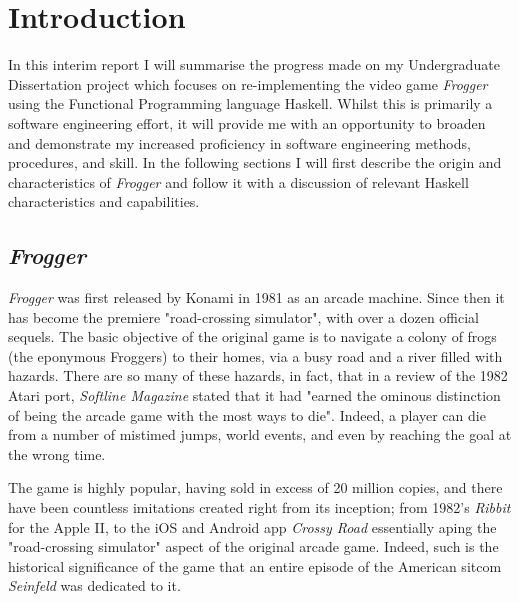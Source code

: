 \documentclass[12pt, a4paper]{report}
\begin{document}
\maketitle

\tableofcontents
\pagebreak

\section{Introduction}
In this interim report I will summarise the progress made on my Undergraduate Dissertation project which focuses on re-implementing the video game \textit{Frogger} using the Functional Programming language Haskell.
Whilst this is primarily a software engineering effort, it will provide me with an opportunity to broaden and demonstrate my increased proficiency in software engineering methods, procedures, and skill.
In the following sections I will first describe the origin and characteristics of \textit{Frogger} and follow it with a discussion of relevant Haskell characteristics and capabilities.

\subsection{\textit{Frogger}}
\textit{Frogger} was first released by Konami in 1981 as an arcade machine.
Since then it has become the premiere "road-crossing simulator", with over a dozen official sequels.
The basic objective of the original game is to navigate a colony of frogs (the eponymous Froggers) to their homes, via a busy road and a river filled with hazards.
There are so many of these hazards, in fact, that in a review of the 1982 Atari port, \textit{Softline Magazine} stated that it had "earned the ominous distinction of being the arcade game with the most ways to die"\cite{softline}. Indeed, a player can die from a number of mistimed jumps, world events, and even by reaching the goal at the wrong time.

\par

The game is highly popular, having sold in excess of 20 million copies\cite{konamipressrelease}, and there have been countless imitations created right from its inception; from 1982's \textit{Ribbit} for the Apple II, to the iOS and Android app \textit{Crossy Road} essentially aping the "road-crossing simulator" aspect of the original arcade game.
Indeed, such is the historical significance of the game that an entire episode of the American sitcom \textit{Seinfeld} was dedicated to it\cite{seinfeld}.
\end{document}
